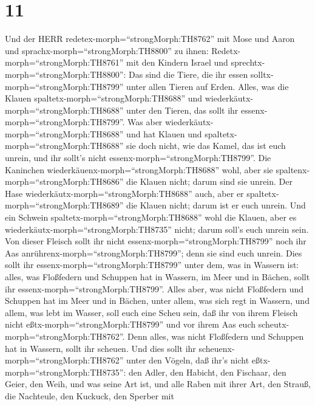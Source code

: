 \hypertarget{section-10}{%
\section{11}\label{section-10}}

 Und der HERR redetex-morph=``strongMorph:TH8762'' mit Mose
und Aaron und sprachx-morph=``strongMorph:TH8800'' zu ihnen:
 Redetx-morph=``strongMorph:TH8761'' mit den Kindern Israel
und sprechtx-morph=``strongMorph:TH8800'': Das sind die Tiere, die ihr
essen solltx-morph=``strongMorph:TH8799'' unter allen Tieren auf Erden.
 Alles, was die Klauen spaltetx-morph=``strongMorph:TH8688''
und wiederkäutx-morph=``strongMorph:TH8688'' unter den Tieren, das sollt
ihr essenx-morph=``strongMorph:TH8799''.  Was aber
wiederkäutx-morph=``strongMorph:TH8688'' und hat Klauen und
spaltetx-morph=``strongMorph:TH8688'' sie doch nicht, wie das Kamel, das
ist euch unrein, und ihr sollt's nicht
essenx-morph=``strongMorph:TH8799''.  Die Kaninchen
wiederkäuenx-morph=``strongMorph:TH8688'' wohl, aber sie
spaltenx-morph=``strongMorph:TH8686'' die Klauen nicht; darum sind sie
unrein.  Der Hase wiederkäutx-morph=``strongMorph:TH8688''
auch, aber er spaltetx-morph=``strongMorph:TH8689'' die Klauen nicht;
darum ist er euch unrein.  Und ein Schwein
spaltetx-morph=``strongMorph:TH8688'' wohl die Klauen, aber es
wiederkäutx-morph=``strongMorph:TH8735'' nicht; darum soll's euch unrein
sein.  Von dieser Fleisch sollt ihr nicht
essenx-morph=``strongMorph:TH8799'' noch ihr Aas
anrührenx-morph=``strongMorph:TH8799''; denn sie sind euch unrein.
 Dies sollt ihr essenx-morph=``strongMorph:TH8799'' unter
dem, was in Wassern ist: alles, was Floßfedern und Schuppen hat in
Wassern, im Meer und in Bächen, sollt ihr
essenx-morph=``strongMorph:TH8799''.  Alles aber, was nicht
Floßfedern und Schuppen hat im Meer und in Bächen, unter allem, was sich
regt in Wassern, und allem, was lebt im Wasser, soll euch eine Scheu
sein,  daß ihr von ihrem Fleisch nicht
eßtx-morph=``strongMorph:TH8799'' und vor ihrem Aas euch
scheutx-morph=``strongMorph:TH8762''.  Denn alles, was
nicht Floßfedern und Schuppen hat in Wassern, sollt ihr scheuen.
 Und dies sollt ihr scheuenx-morph=``strongMorph:TH8762''
unter den Vögeln, daß ihr's nicht eßtx-morph=``strongMorph:TH8735'': den
Adler, den Habicht, den Fischaar,  den Geier, den Weih, und
was seine Art ist,  und alle Raben mit ihrer Art,
 den Strauß, die Nachteule, den Kuckuck, den Sperber mit
